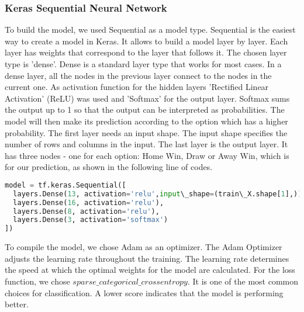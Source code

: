 \subsubsection{Keras Sequential Neural Network}

To build the model, we used Sequential as a model type. Sequential is the easiest way to create a model in Keras. It allows to build a model layer by layer. Each layer has weights that correspond to the layer that follows it.\newline%
The chosen layer type is 'dense'. Dense is a standard layer type that works for most cases. In a dense layer, all the nodes in the previous layer connect to the nodes in the current one.\newline
As activation function for the hidden layers 'Rectified Linear Activation' (ReLU) was used and 'Softmax' for the output layer. Softmax sums the output up to 1 so that the output can be interpreted as probabilities. The model will then make its prediction according to the option which has a higher probability.\newline \newline
The first layer needs an input shape. The input shape specifies the number of rows and columns in the input.\newline
The last layer is the output layer. It has three nodes - one for each option: Home Win, Draw or Away Win, which is for our prediction, as shown in the following line of codes.\newline \newline
\begin{lstlisting}[language=Python, caption=Python code for simple Keras Sequantial Model Instantiation]
model = tf.keras.Sequential([ 
  layers.Dense(13, activation='relu',input\_shape=(train\_X.shape[1],)), 
  layers.Dense(16, activation='relu'),
  layers.Dense(8, activation='relu'),
  layers.Dense(3, activation='softmax')
])
\end{lstlisting}
To compile the model, we chose Adam as an optimizer. The Adam Optimizer adjusts the learning rate throughout the training.\newline
The learning rate determines the speed at which the optimal weights for the model are calculated.\newline
For the loss function, we chose $sparse\_categorical\_crossentropy$. It is one of the most common choices for classification. A lower score indicates that the model is performing better.\newline \newline
